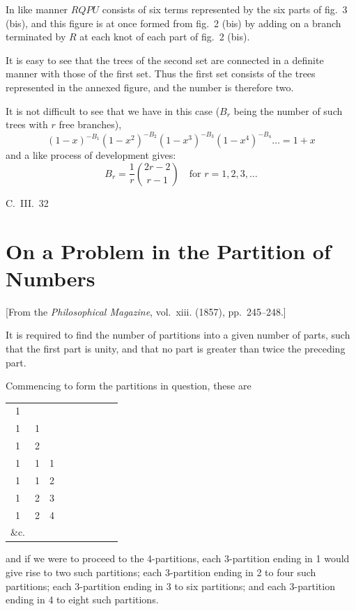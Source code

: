 \documentclass[11pt,a4paper]{book}
\begin{document}
{{In like manner $RQPU$ consists of six terms represented by the six parts of fig.~3 (bis), and this figure is at once formed from fig.~2 (bis) by adding on a branch terminated by $R$ at each knot of each part of fig.~2 (bis).

It is easy to see that the trees of the second set are connected in a definite manner with those of the first set. Thus the first set consists of the trees represented in the annexed figure, and the number is therefore two.

It is not difficult to see that we have in this case ($B_r$ being the number of such trees with $r$ free branches),
\[
(1-x)^{-B_1}(1-x^2)^{-B_2}(1-x^3)^{-B_3}(1-x^4)^{-B_4}\ldots = 1 + x
\]
and a like process of development gives:
\[
B_r = \frac{1}{r}\binom{2r-2}{r-1} \quad \text{for } r = 1, 2, 3, \ldots
\]

\hfill C.~III.~32
\newpage


\section{On a Problem in the Partition of Numbers}
\label{sec:204}

[From the \textit{Philosophical Magazine}, vol.~xiii. (1857), pp.~245--248.]
\vspace{1em}

It is required to find the number of partitions into a given number of parts, such that the first part is unity, and that no part is greater than twice the preceding part.

Commencing to form the partitions in question, these are
\begin{center}
\begin{tabular}{ccccccccc}
1 & & & & & & & & \\
1 & 1 & & & & & & & \\
1 & 2 & & & & & & & \\
1 & 1 & 1 & & & & & & \\
1 & 1 & 2 & & & & & & \\
1 & 2 & 3 & & & & & & \\
1 & 2 & 4 & & & & & & \\
\&c. & & & & & & & 
\end{tabular}
\end{center}
and if we were to proceed to the 4-partitions, each 3-partition ending in 1 would give rise to two such partitions; each 3-partition ending in 2 to four such partitions; each 3-partition ending in 3 to six partitions; and each 3-partition ending in 4 to eight such partitions.

}}
\end{document}
